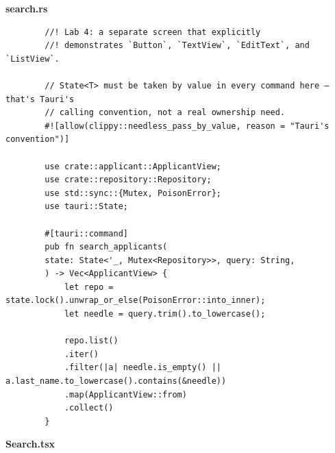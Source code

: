 \documentclass[14pt, a4paper]{extreport}
\begin{document}
	\textbf{search.rs}

	\begin{verbatim}
		//! Lab 4: a separate screen that explicitly
		//! demonstrates `Button`, `TextView`, `EditText`, and `ListView`.
		
		// State<T> must be taken by value in every command here — that's Tauri's
		// calling convention, not a real ownership need.
		#![allow(clippy::needless_pass_by_value, reason = "Tauri's convention")]
		
		use crate::applicant::ApplicantView;
		use crate::repository::Repository;
		use std::sync::{Mutex, PoisonError};
		use tauri::State;
		
		#[tauri::command]
		pub fn search_applicants(
		state: State<'_, Mutex<Repository>>, query: String,
		) -> Vec<ApplicantView> {
			let repo = state.lock().unwrap_or_else(PoisonError::into_inner);
			let needle = query.trim().to_lowercase();
			
			repo.list()
			.iter()
			.filter(|a| needle.is_empty() || a.last_name.to_lowercase().contains(&needle))
			.map(ApplicantView::from)
			.collect()
		}
	\end{verbatim}
	
	\textbf{Search.tsx}
	
\end{document}
